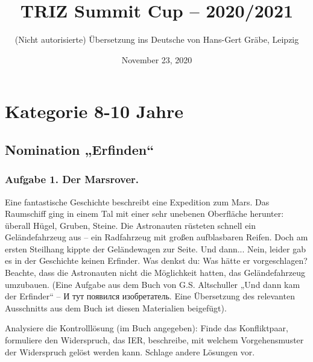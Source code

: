 \documentclass[11pt,a4paper]{article}
\title{TRIZ Summit Cup – 2020/2021}
\author{(Nicht autorisierte) Übersetzung ins Deutsche von Hans-Gert Gr\"abe,
  Leipzig}
\date{November 23, 2020}
\begin{document}
\maketitle
\tableofcontents
\enlargethispage{12em}
\clearpage
\section{Kategorie 8-10 Jahre}

\subsection{Nomination „Erfinden“}

\subsubsection*{Aufgabe 1. Der Marsrover.}
Eine fantastische Geschichte beschreibt eine Expedition zum Mars.  Das
Raumschiff ging in einem Tal mit einer sehr unebenen Oberfläche herunter:
überall Hügel, Gruben, Steine. Die Astronauten rüsteten schnell ein
Geländefahrzeug aus -- ein Radfahrzeug mit großen aufblasbaren Reifen. Doch am
ersten Steilhang kippte der Geländewagen zur Seite. Und dann... Nein, leider
gab es in der Geschichte keinen Erfinder. Was denkst du: Was hätte er
vorgeschlagen? Beachte, dass die Astronauten nicht die Möglichkeit hatten, das
Geländefahrzeug umzubauen.  (Eine Aufgabe aus dem Buch von G.S. Altschuller
„Und dann kam der Erfinder“ -- \foreignlanguage{russian}{И тут появился
  изобретатель}. Eine Übersetzung des relevanten Ausschnitts aus dem Buch ist
diesen Materialien beigefügt).

Analysiere die Kontrolllösung (im Buch angegeben): Finde das Konfliktpaar,
formuliere den Widerspruch, das IER, beschreibe, mit welchem Vorgehensmuster
der Widerspruch gelöst werden kann. Schlage andere Lösungen vor.
\end{document}
